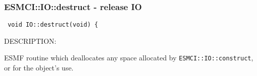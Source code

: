  
\setlength{\oldparskip}{\parskip}
\setlength{\parskip}{1.5ex}
\setlength{\oldparindent}{\parindent}
\setlength{\parindent}{0pt}
\setlength{\oldbaselineskip}{\baselineskip}
\setlength{\baselineskip}{11pt}
 
\def\bv{\begin{verbatim}}
\def\ev{\end{verbatim}}
\def\be{\begin{equation}}
\def\ee{\end{equation}}
\def\bea{\begin{eqnarray}}
\def\eea{\end{eqnarray}}
\def\bi{\begin{itemize}}
\def\ei{\end{itemize}}
\def\bn{\begin{enumerate}}
\def\en{\end{enumerate}}
\def\bd{\begin{description}}
\def\ed{\end{description}}
\def\({\left (}
\def\){\right )}
\def\[{\left [}
\def\]{\right ]}
\def\<{\left  \langle}
\def\>{\right \rangle}
\def\cI{{\cal I}}
\def\diag{\mathop{\rm diag}}
\def\tr{\mathop{\rm tr}}


 
\subsubsection [ESMCI::IO::destruct] {ESMCI::IO::destruct - release IO}


  
\begin{verbatim} void IO::destruct(void) {\end{verbatim}
{\sf DESCRIPTION:\\ }


        ESMF routine which deallocates any space allocated by
        {\tt ESMCI::IO::construct}, or for the object's use.
   
